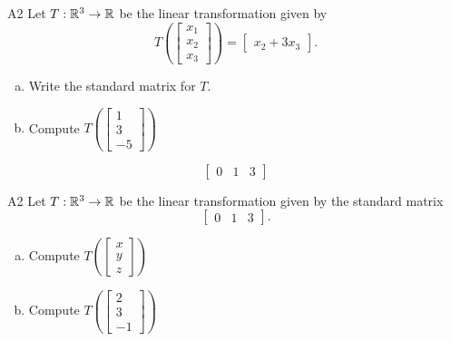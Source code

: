 \begin{problem}{A2}
Let $T: \mathbb{R}^3 \rightarrow \mathbb{R}$ be the linear transformation given by $$T\left(\begin{bmatrix} x_1 \\ x_2 \\ x_3  \end{bmatrix} \right) = \begin{bmatrix} x_2+3x_3 \end{bmatrix}.$$
\begin{enumerate}[(a)]
\item Write the standard matrix for $T$.
\item Compute \( T\left( \begin{bmatrix} 1 \\ 3 \\ -5\end{bmatrix} \right) \)
\end{enumerate}
\end{problem}
\begin{solution}
$$\begin{bmatrix} 0 & 1 & 3 \end{bmatrix}$$
\end{solution}

\begin{problem}{A2}
Let $T: \mathbb{R}^3 \rightarrow \mathbb{R}$ be the linear transformation given by the standard matrix
$$\begin{bmatrix} 0 & 1 & 3 \end{bmatrix}.$$
\begin{enumerate}[(a)]
\item Compute \( T\left( \begin{bmatrix}x\\ y \\ z  \end{bmatrix} \right) \)
\item Compute \( T\left( \begin{bmatrix} 2 \\ 3 \\ -1\end{bmatrix} \right) \)
\end{enumerate}
\end{problem}

